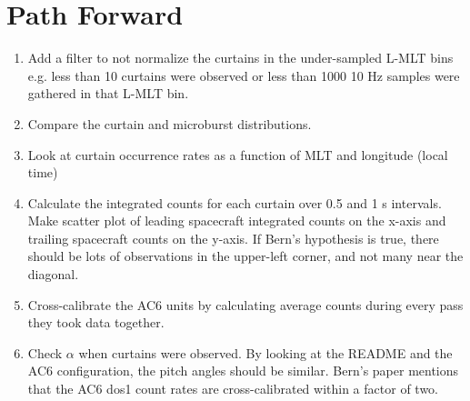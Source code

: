 \documentclass[
10pt, %
a4paper, %
oneside, %
headinclude,footinclude, %
BCOR5mm, %
]{scrartcl}
\begin{document}
\section{Path Forward}
\begin{enumerate}
\item Add a filter to not normalize the curtains in the under-sampled L-MLT bins e.g. less than 10 curtains were observed or less than 1000 10 Hz samples were gathered in that L-MLT bin.
\item Compare the curtain and microburst distributions.
\item Look at curtain occurrence rates as a function of MLT and longitude (local time)
\item Calculate the integrated counts for each curtain over 0.5 and 1 s intervals. Make scatter plot of leading spacecraft integrated counts on the x-axis and trailing spacecraft counts on the y-axis. If Bern's hypothesis is true, there should be lots of observations in the upper-left corner, and not many near the diagonal.
\item Cross-calibrate the AC6 units by calculating average counts during every pass they took data together.
\item Check $\alpha$ when curtains were observed. By looking at the README and the AC6 configuration, the pitch angles should be similar. Bern's paper mentions that the AC6 dos1 count rates are cross-calibrated within a factor of two.

 
\end{enumerate}



%


\end{document}
